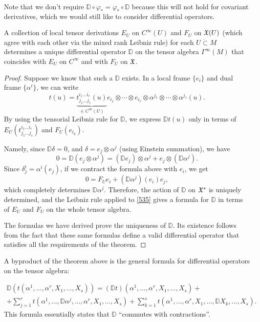 Note that we don't require $\mathbb{D}\circ\varphi_\ast=\varphi_\ast\circ \mathbb{D}$ because this will not hold for covariant derivatives, which we would still like to consider differential operators.

\begin{thm}\label{Willmore}
    A collection of local tensor derivations $E_U$ on $C^\infty(U)$ and $F_U$ on $\mathfrak{X}(U)$ (which agree with each other via the mixed rank Leibniz rule) for each $U\mathring{\subset}M$ determines a unique differential operator $\mathbb{D}$ on the tensor algebra $\Gamma^\infty(M)$ that coincides with $E_U$ on $C^\infty$ and with $F_U$ on $\mathfrak{X}$.
\end{thm}
\begin{proof}
    Suppose we know that such a $\mathbb{D}$ exists. In a local frame $\{e_i\}$ and dual frame $\{\alpha^i\}$, we can write
    \[t(u)=\underbrace{t_{j_1\ldots j_s}^{i_1\ldots i_r}(u)}_{\in C^\infty(U)} e_{i_1}\otimes \cdots \otimes e_{i_r}\otimes \alpha^{j_1}\otimes \cdots\otimes \alpha^{j_s}(u).\label{535}\]
    By using the tensorial Leibniz rule for $\mathbb{D}$, we express $\mathbb{D}t(u)$ only in terms of $E_U(t_{j_1\ldots j_s}^{i_1\ldots i_r})$ and $F_U(e_{i_k})$.
    
    Namely, since $\mathbb{D}\delta=0$, and $\delta=e_j\otimes \alpha^j$ (using Einstein summation), we have 
    \[0=\mathbb{D}(e_j\otimes \alpha^j)=(\mathbb{D}e_j)\otimes \alpha^j+e_j\otimes (\mathbb{D}\alpha^j).\]
    Since $\delta^i_j=\alpha^i(e_j)$, if we contract the formula above with $e_i$, we get
    \[0=F_U e_i+(\mathbb{D}\alpha^j)(e_i) e_j,\]
    which completely determines $\mathbb{D}\alpha^j$. Therefore, the action of $\mathbb{D}$ on $\mathfrak{X}^\ast$ is uniquely determined, and the Leibniz rule applied to \ref{535} gives a formula for $\mathbb{D}$ in terms of $E_U$ and $F_U$ on the whole tensor algebra.
    
    The formulas we have derived prove the uniqueness of $\mathbb{D}$. Its existence follows from the fact that these same formulas define a valid differential operator that satisfies all the requirements of the theorem.
\end{proof}
\begin{cor}\label{cor willmore formula}
    A byproduct of the theorem above is the general formula for differential operators on the tensor algebra:

    \begin{multline}
        \mathbb{D}\left(t(\alpha^1,\ldots,\alpha^r,X_1,\ldots,X_s)\right)=(\mathbb{D}t)(\alpha^1,\ldots,\alpha^r,X_1,\ldots,X_s)+\\+\sum_{j=1}^r t\left(\alpha^1,\ldots,\mathbb{D}\alpha^j,\ldots,\alpha^r,X_1,\ldots,X_s\right)+\sum_{k=1}^s t\left(\alpha^1,\ldots,\alpha^r,X_1,\ldots,\mathbb{D}X_k,\ldots,X_s\right).
    \end{multline}
    This formula essentially states that $\mathbb{D}$ ``commutes with contractions''.
\end{cor}

